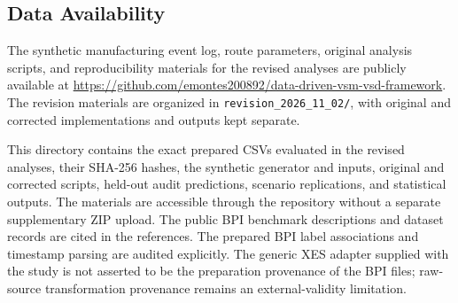 \subsection*{Data Availability}
The synthetic manufacturing event log, route parameters, original analysis scripts, and reproducibility materials for the revised analyses are publicly available at \url{https://github.com/emontes200892/data-driven-vsm-vsd-framework}. The revision materials are organized in \texttt{revision\_2026\_11\_02/}, with original and corrected implementations and outputs kept separate.

This directory contains the exact prepared CSVs evaluated in the revised analyses, their SHA-256 hashes, the synthetic generator and inputs, original and corrected scripts, held-out audit predictions, scenario replications, and statistical outputs. The materials are accessible through the repository without a separate supplementary ZIP upload. The public BPI benchmark descriptions and dataset records are cited in the references. The prepared BPI label associations and timestamp parsing are audited explicitly. The generic XES adapter supplied with the study is not asserted to be the preparation provenance of the BPI files; raw-source transformation provenance remains an external-validity limitation.


